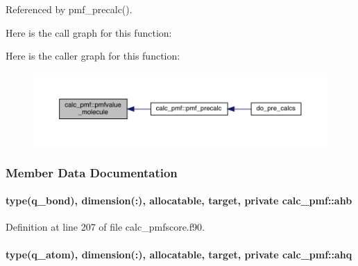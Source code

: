 Referenced by pmf\-\_\-precalc().



Here is the call graph for this function\-:




Here is the caller graph for this function\-:
\nopagebreak
\begin{figure}[H]
\begin{center}
\leavevmode
\includegraphics[width=350pt]{classcalc__pmf_ac556c87ce39732c2e96def3d32dd211f_icgraph}
\end{center}
\end{figure}




\subsubsection{Member Data Documentation}
\hypertarget{classcalc__pmf_a5cf70a0742a922b59d0dab2ccea74f52}{
\paragraph[{ahb}]{\setlength{\rightskip}{0pt plus 5cm}type({\bf q\-\_\-bond}), dimension(\-:), allocatable, target, private calc\-\_\-pmf\-::ahb\hspace{0.3cm}{\ttfamily [private]}}}\label{classcalc__pmf_a5cf70a0742a922b59d0dab2ccea74f52}


Definition at line 207 of file calc\-\_\-pmfscore.\-f90.

\hypertarget{classcalc__pmf_a160db6bef6b383e82b4ad6070a3597a9}{
\paragraph[{ahq}]{\setlength{\rightskip}{0pt plus 5cm}type({\bf q\-\_\-atom}), dimension(\-:), allocatable, target, private calc\-\_\-pmf\-::ahq\hspace{0.3cm}{\ttfamily [private]}}}\label{classcalc__pmf_a160db6bef6b383e82b4ad6070a3597a9}


